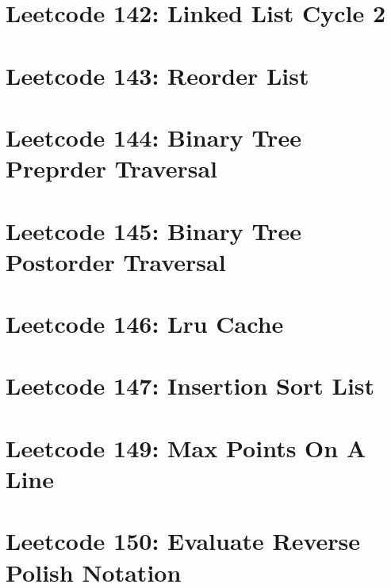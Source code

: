 \documentclass{article}
\begin{document}
\section*{Leetcode 142: Linked List Cycle 2}

\pagebreak 

\section*{Leetcode 143: Reorder List}

\pagebreak 

\section*{Leetcode 144: Binary Tree Preprder Traversal}

\pagebreak 

\section*{Leetcode 145: Binary Tree Postorder Traversal}

\pagebreak 

\section*{Leetcode 146: Lru Cache}

\pagebreak 

\section*{Leetcode 147: Insertion Sort List}

\pagebreak 

\section*{Leetcode 149: Max Points On A Line}

\pagebreak 

\section*{Leetcode 150: Evaluate Reverse Polish Notation}

\pagebreak 
\end{document}
